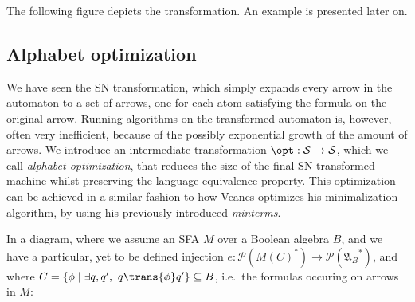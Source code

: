 The following figure depicts the transformation. An example is presented later on.

\begin{center}
\end{center}

\subsection{Alphabet optimization}
\label{optimize}

We have seen the SN transformation, which simply expands every arrow in the automaton to a set of arrows, one for each atom satisfying the formula on the original arrow. Running algorithms on the transformed automaton is, however, often very inefficient, because of the possibly exponential growth of the amount of arrows. We introduce an intermediate transformation $\opt : \mathcal{S} \to \mathcal{S}$, which we call \emph{alphabet optimization}, that reduces the size of the final SN transformed machine whilst preserving the language equivalence property. This optimization can be achieved in a similar fashion to how Veanes optimizes his minimalization algorithm, by using his previously introduced \emph{minterms}.

In a diagram, where we assume an SFA $M$ over a Boolean algebra $B$, and we have a particular, yet to be defined injection $e : \mathcal{P}(M(C)^*) \to \mathcal{P}({\mathfrak{A}_B}^*)$, and where $C = \{ \phi \mid \exists q,q',~q \trans{\phi} q' \} \subseteq B$, i.e.~the formulas occuring on arrows in $M$:

